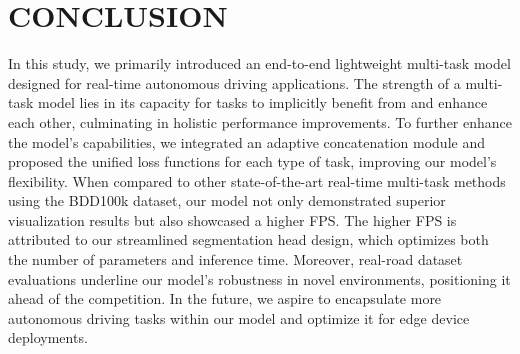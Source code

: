 \documentclass[lettersize,journal]{IEEEtran}
\begin{document}
\section{CONCLUSION}
\label{sec: CONCLUSION}

In this study, we primarily introduced an end-to-end lightweight multi-task model designed for real-time autonomous driving applications. The strength of a multi-task model lies in its capacity for tasks to implicitly benefit from and enhance each other, culminating in holistic performance improvements. To further enhance the model's capabilities, we integrated an adaptive concatenation module and proposed the unified loss functions for each type of task, improving our model's flexibility. When compared to other state-of-the-art real-time multi-task methods using the BDD100k dataset, our model not only demonstrated superior visualization results but also showcased a higher FPS. The higher FPS is attributed to our streamlined segmentation head design, which optimizes both the number of parameters and inference time. Moreover, real-road dataset evaluations underline our model's robustness in novel environments, positioning it ahead of the competition. In the future, we aspire to encapsulate more autonomous driving tasks within our model and optimize it for edge device deployments.




\end{document}
